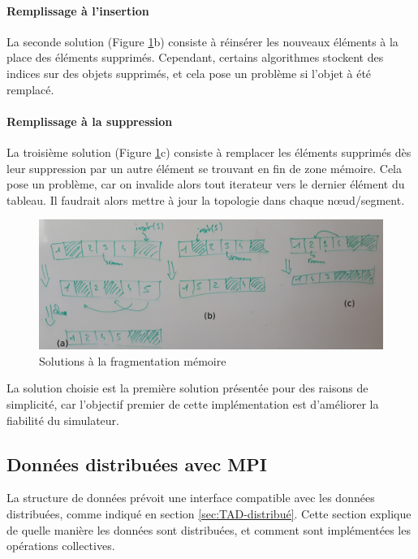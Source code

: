 \paragraph{Remplissage à l'insertion}
La seconde solution (Figure \ref{fig:fragmentation_memoire}b) consiste à réinsérer les nouveaux éléments à la place des éléments supprimés. Cependant, certains algorithmes stockent des indices sur des objets supprimés, et cela pose un problème si l'objet à été remplacé.

\paragraph{Remplissage à la suppression}
La troisième solution (Figure \ref{fig:fragmentation_memoire}c) consiste à remplacer les éléments supprimés dès leur suppression par un autre élément se trouvant en fin de zone mémoire. Cela pose un problème, car on invalide alors tout iterateur vers le dernier élément du tableau. Il faudrait alors mettre à jour la topologie dans chaque nœud/segment.

\begin{figure}[H]
	\centering
		\includegraphics[width=\textwidth]{img/fragmentation_memoire}
		\caption{Solutions à la fragmentation mémoire}
		\label{fig:fragmentation_memoire}
\end{figure}

La solution choisie est la première solution présentée pour des raisons de simplicité, car l'objectif premier de cette implémentation est d'améliorer la fiabilité du simulateur.

\subsection{Données distribuées avec MPI}

La structure de données prévoit une interface compatible avec les données distribuées, comme indiqué en section \ref{sec:TAD-distribué}. Cette section explique de quelle manière les données sont distribuées, et comment sont implémentées les opérations collectives.

